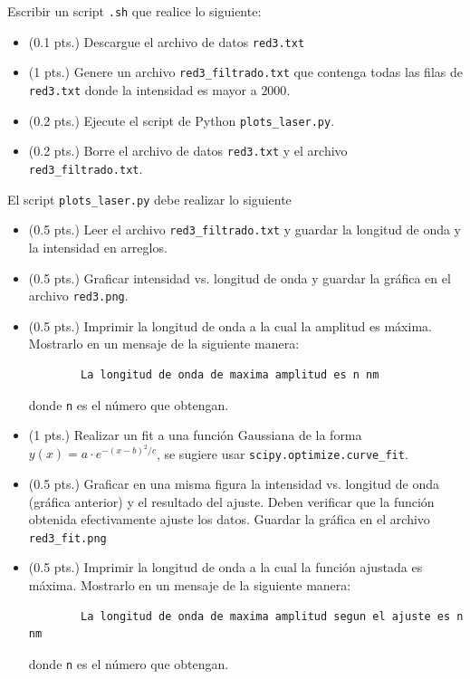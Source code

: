 \documentclass[11pt,letterpaper]{exam}
\begin{document}
\begin{questions}
 
\question[1.5]

Escribir un script \verb'.sh' que realice lo siguiente:

\begin{itemize}
	\item (0.1 pts.) Descargue el archivo de datos \verb'red3.txt'
	\item (1 pts.) Genere un archivo \verb'red3_filtrado.txt' que contenga todas las filas de \verb'red3.txt' donde la intensidad es mayor a $2000$.
	\item (0.2 pts.) Ejecute el script de Python \verb'plots_laser.py'.
	\item (0.2 pts.) Borre el archivo de datos \verb'red3.txt' y el archivo \verb'red3_filtrado.txt'.
\end{itemize}

\question[3.5]

El script \verb'plots_laser.py' debe realizar lo siguiente

\begin{itemize}
	\item (0.5 pts.) Leer el archivo \verb'red3_filtrado.txt' y guardar la longitud de onda y la intensidad en arreglos.
	\item (0.5 pts.) Graficar intensidad vs. longitud de onda y guardar la gr\'afica en el archivo \verb'red3.png'.
	\item (0.5 pts.) Imprimir la longitud de onda a la cual la amplitud es m\'axima. Mostrarlo en un mensaje de la siguiente manera:
		\begin{verbatim}
		La longitud de onda de maxima amplitud es n nm
		\end{verbatim}
	donde \verb'n' es el n\'umero que obtengan.
	\item (1 pts.) Realizar un fit a una funci\'on Gaussiana de la forma $y(x) = a\cdot e^{-(x-b)^2/c}$, se sugiere usar \verb'scipy.optimize.curve_fit'.
	\item (0.5 pts.) Graficar en una misma figura la intensidad vs. longitud de onda (gr\'afica anterior) y el resultado del ajuste. Deben verificar que la funci\'on obtenida efectivamente ajuste los datos. Guardar la gr\'afica en el archivo \verb'red3_fit.png'
	\item (0.5 pts.) Imprimir la longitud de onda a la cual la funci\'on ajustada es m\'axima. Mostrarlo en un mensaje de la siguiente manera:
		\begin{verbatim}
		La longitud de onda de maxima amplitud segun el ajuste es n nm
		\end{verbatim}
	donde \verb'n' es el n\'umero que obtengan.
\end{itemize}

\end{questions}
\end{document}
